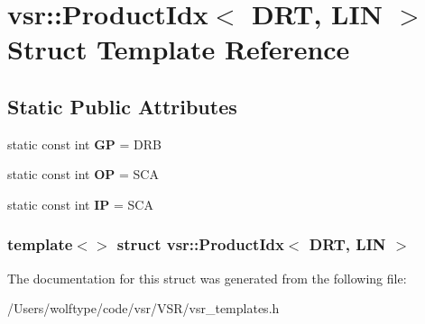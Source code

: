 \hypertarget{structvsr_1_1_product_idx_3_01_d_r_t_00_01_l_i_n_01_4}{\section{vsr\-:\-:Product\-Idx$<$ D\-R\-T, L\-I\-N $>$ Struct Template Reference}
\label{structvsr_1_1_product_idx_3_01_d_r_t_00_01_l_i_n_01_4}
}
\subsection*{Static Public Attributes}
\begin{DoxyCompactItemize}
\item 
\hypertarget{structvsr_1_1_product_idx_3_01_d_r_t_00_01_l_i_n_01_4_afe83a5fa512337b63ebe5b98553d34ae}{static const int {\bfseries G\-P} = D\-R\-B}\label{structvsr_1_1_product_idx_3_01_d_r_t_00_01_l_i_n_01_4_afe83a5fa512337b63ebe5b98553d34ae}

\item 
\hypertarget{structvsr_1_1_product_idx_3_01_d_r_t_00_01_l_i_n_01_4_a5eef5360e077236adfb2cb79b7e52489}{static const int {\bfseries O\-P} = S\-C\-A}\label{structvsr_1_1_product_idx_3_01_d_r_t_00_01_l_i_n_01_4_a5eef5360e077236adfb2cb79b7e52489}

\item 
\hypertarget{structvsr_1_1_product_idx_3_01_d_r_t_00_01_l_i_n_01_4_a43250caf44cdbb123ad4a927303982e5}{static const int {\bfseries I\-P} = S\-C\-A}\label{structvsr_1_1_product_idx_3_01_d_r_t_00_01_l_i_n_01_4_a43250caf44cdbb123ad4a927303982e5}

\end{DoxyCompactItemize}
\subsubsection*{template$<$$>$ struct vsr\-::\-Product\-Idx$<$ D\-R\-T, L\-I\-N $>$}



The documentation for this struct was generated from the following file\-:\begin{DoxyCompactItemize}
\item 
/\-Users/wolftype/code/vsr/\-V\-S\-R/vsr\-\_\-templates.\-h\end{DoxyCompactItemize}
